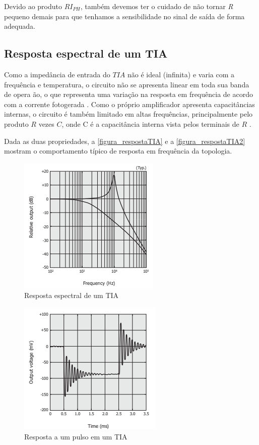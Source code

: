 Devido ao produto $RI_{PH}$, também devemos ter o cuidado de não tornar \textit{R} pequeno demais para que tenhamos a sensibilidade no sinal de saída de forma adequada.

\subsection{Resposta espectral de um TIA}

Como a imped\^ancia de entrada do $TIA$ não \'e ideal (infinita) e varia com a frequ\^encia e temperatura, o circuito não se apresenta linear em toda sua banda de opera ão, o que representa uma variação na resposta em frequ\^encia de acordo com a corrente fotogerada \cite{hamamatsu}.
Como o pr\'oprio amplificador apresenta capacit\^ancias internas, o circuito \'e tamb\'em limitado em altas frequ\^encias, principalmente pelo produto $R$ vezes $C$, onde C \'e a capacit\^ancia interna vista pelos terminais de $R$ \cite{hamamatsu}.

Dada as duas propriedades, a \autoref{figura_respostaTIA} e a \autoref{figura_respostaTIA2} mostram o comportamento t\'ipico de resposta em frequ\^encia da topologia.

\begin{figure}[!h]
	\caption{\label{figura_respostaTIA}Resposta espectral de um TIA}
	\begin{center}
	    \includegraphics[scale=0.8]{Imagens/RespostaEspectralTIA.png}
	\end{center}
\end{figure}

\begin{figure}[!h]
	\caption{\label{figura_respostaTIA2}Resposta a um pulso em um TIA}
	\begin{center}
	    \includegraphics[scale=0.8]{Imagens/RespostaEspectralTIA2.png}
	\end{center}
\end{figure}